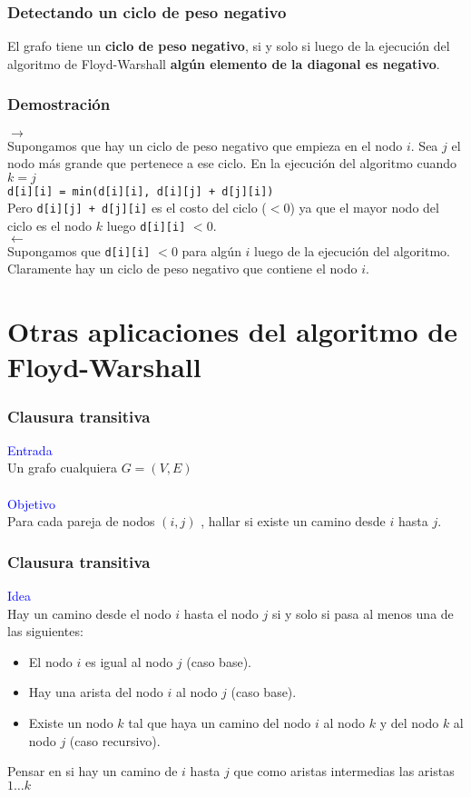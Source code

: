 \documentclass{beamer}
\begin{document}
	\begin{frame}
		\frametitle{Detectando un ciclo de peso negativo}
		El grafo tiene un \textbf{ciclo de peso negativo}, si y solo si luego de la ejecución del algoritmo de Floyd-Warshall \textbf{algún elemento de la diagonal es negativo}. \\
	\end{frame}
	
	\begin{frame}[fragile]
		\frametitle{Demostración}
		$\rightarrow$ \\
		Supongamos que hay un ciclo de peso negativo que empieza en el nodo $i$. Sea $j$ el nodo más grande que pertenece a ese ciclo. En la ejecución del algoritmo cuando $k = j$ \\
		\verb|d[i][i] = min(d[i][i], d[i][j] + d[j][i])|\\
		Pero \verb|d[i][j] + d[j][i]| es el costo del ciclo ($< 0$) ya que el mayor nodo del ciclo es el nodo $k$ luego \verb|d[i][i]| $< 0$.\\
		\vfill 
		$\leftarrow$ \\
		Supongamos que \verb|d[i][i]| $< 0$ para algún $i$ luego de la ejecución del algoritmo. Claramente hay un ciclo de peso negativo que contiene el nodo $i$.
	\end{frame}

\section[Aplicaciones]{Otras aplicaciones del algoritmo de Floyd-Warshall}
	\begin{frame}
		\frametitle{Clausura transitiva}
		\textcolor{blue}{\large Entrada}\\
		Un grafo cualquiera $G = (V, E)$ \\ \quad \\
		\textcolor{blue}{\large Objetivo}\\
		Para cada pareja de nodos $(i, j)$ , hallar si existe un camino desde $i$ hasta $j$.
	\end{frame}
	
	\begin{frame}
		\frametitle{Clausura transitiva}
		\textcolor{blue}{\large Idea}\\
		Hay un camino desde el nodo $i$ hasta el nodo $j$ si y solo si pasa al menos una de las siguientes:
		\begin{itemize}
			\item El nodo $i$ es igual al nodo $j$ (caso base).
			\item Hay una arista del nodo $i$ al nodo $j$ (caso base).
			\item Existe un nodo $k$ tal que haya un camino del nodo $i$ al nodo $k$ y del nodo $k$ al nodo $j$ (caso recursivo).
		\end{itemize}
		\vfill
		{\Large Pensar en si hay un camino de $i$ hasta $j$ que como aristas intermedias las aristas $1 \ldots k$}
	\end{frame}
	
\end{document}
